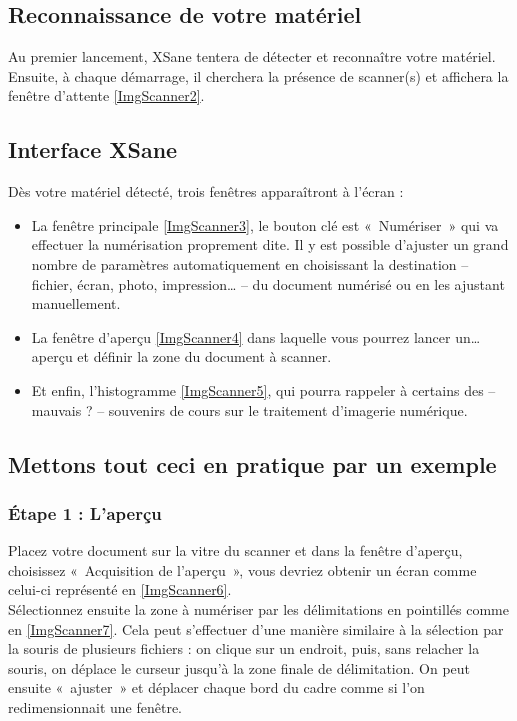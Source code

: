 \subsection{Reconnaissance de votre matériel}
Au premier lancement, XSane tentera de détecter et reconnaître votre matériel. Ensuite, à chaque démarrage, il cherchera la présence de scanner(s) et affichera la fenêtre d'attente \ref{ImgScanner2}.
\subsection{Interface XSane}
Dès votre matériel détecté, trois fenêtres apparaîtront à l'écran : 
\ScannerPresentation
\begin{itemize}
\item La fenêtre principale \ref{ImgScanner3}, le bouton clé est «~Numériser~» qui va effectuer la numérisation proprement dite. Il y est possible d'ajuster un grand nombre de paramètres automatiquement en choisissant la destination -- fichier, écran, photo, impression\ldots{} -- du document numérisé ou en les ajustant manuellement.
\item La fenêtre d'aperçu \ref{ImgScanner4} dans laquelle vous pourrez lancer un\ldots{} aperçu et définir la zone du document à scanner.
\item Et enfin, l'histogramme \ref{ImgScanner5}, qui pourra rappeler à certains des -- mauvais ? -- souvenirs de cours sur le traitement d'imagerie numérique.
\end{itemize}
\subsection{Mettons tout ceci en pratique par un exemple}
\subsubsection{Étape 1 : L'aperçu}
Placez votre document sur la vitre du scanner et dans la fenêtre d'aperçu, choisissez «~Acquisition de l'aperçu~», vous devriez obtenir un écran comme celui-ci représenté en \ref{ImgScanner6}.\\
Sélectionnez ensuite la zone à numériser par les délimitations en pointillés comme en \ref{ImgScanner7}. Cela peut s'effectuer d'une manière similaire à la sélection par la souris de plusieurs fichiers : on clique sur un endroit, puis, sans relacher la souris, on déplace le curseur jusqu'à la zone finale de délimitation. On peut ensuite «~ajuster~» et déplacer chaque bord du cadre comme si l'on redimensionnait une fenêtre.\par
\ScannerEtapeUn
